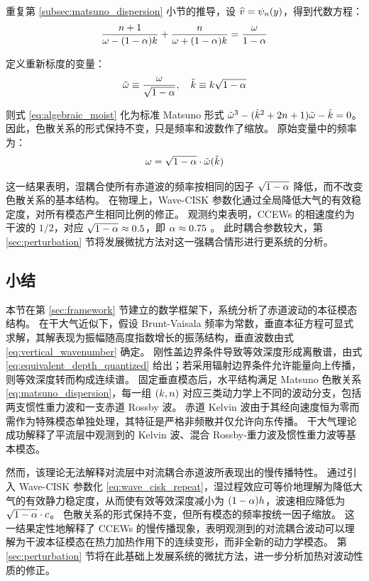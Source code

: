 重复第 \ref{subsec:matsuno_dispersion} 小节的推导，设 $\widehat{v} = \psi_{n}(y)$，得到代数方程：
\begin{equation}
    \frac{n + 1}{\omega - (1 - \alpha)k} + \frac{n}{\omega + (1 - \alpha)k} = \frac{\omega}{1 - \alpha}
    \label{eq:algebraic_moist}
\end{equation}

定义重新标度的变量：
\begin{equation}
    \tilde{\omega} \equiv \frac{\omega}{\sqrt{1 - \alpha}}, \quad \tilde{k} \equiv k\sqrt{1 - \alpha}
\end{equation}

则式 \eqref{eq:algebraic_moist} 化为标准 Matsuno 形式 $\tilde{\omega}^3 - (\tilde{k}^2 + 2n + 1)\tilde{\omega} - \tilde{k} = 0$。
因此，色散关系的形式保持不变，只是频率和波数作了缩放。
原始变量中的频率为：
\begin{equation}
    \omega = \sqrt{1 - \alpha}\cdot\tilde{\omega}(\tilde{k})
    \label{eq:frequency_rescaling}
\end{equation}

这一结果表明，湿耦合使所有赤道波的频率按相同的因子 $\sqrt{1-\alpha}$ 降低，而不改变色散关系的基本结构。
在物理上，Wave-CISK 参数化通过全局降低大气的有效稳定度，对所有模态产生相同比例的修正。
观测约束表明，CCEWs 的相速度约为干波的 $1/2$，对应 $\sqrt{1-\alpha} \approx 0.5$，即 $\alpha \approx 0.75$ \citep{kiladisConvectivelyCoupledEquatorial2009}。
此时耦合参数较大，第 \ref{sec:perturbation} 节将发展微扰方法对这一强耦合情形进行更系统的分析。

\subsection{小结}
\label{subsec:chap3_summary}

本节在第 \ref{sec:framework} 节建立的数学框架下，系统分析了赤道波动的本征模态结构。
在干大气近似下，假设 Brunt-Vaisala 频率为常数，垂直本征方程可显式求解，其解表现为振幅随高度指数增长的振荡结构，垂直波数由式 \eqref{eq:vertical_wavenumber} 确定。
刚性盖边界条件导致等效深度形成离散谱，由式 \eqref{eq:equivalent_depth_quantized} 给出；若采用辐射边界条件允许能量向上传播，则等效深度转而构成连续谱。
固定垂直模态后，水平结构满足 Matsuno 色散关系 \eqref{eq:matsuno_dispersion}，每一组 $(k, n)$ 对应三类动力学上不同的波动分支，包括两支惯性重力波和一支赤道 Rossby 波。
赤道 Kelvin 波由于其经向速度恒为零而需作为特殊模态单独处理，其特征是严格非频散并仅允许向东传播。
干大气理论成功解释了平流层中观测到的 Kelvin 波、混合 Rossby-重力波及惯性重力波等基本模态。

然而，该理论无法解释对流层中对流耦合赤道波所表现出的慢传播特性。
通过引入 Wave-CISK 参数化 \eqref{eq:wave_cisk_repeat}，湿过程效应可等价地理解为降低大气的有效静力稳定度，从而使有效等效深度减小为 $(1-\alpha)h$，波速相应降低为 $\sqrt{1-\alpha}\cdot c$。
色散关系的形式保持不变，但所有模态的频率按统一因子缩放。
这一结果定性地解释了 CCEWs 的慢传播现象，表明观测到的对流耦合波动可以理解为干波本征模态在热力加热作用下的连续变形，而非全新的动力学模态。
第 \ref{sec:perturbation} 节将在此基础上发展系统的微扰方法，进一步分析加热对波动性质的修正。
